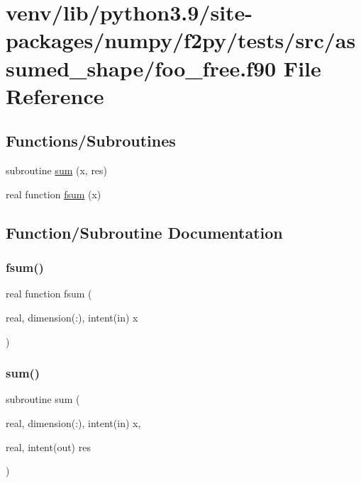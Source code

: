 \hypertarget{assumed__shape_2foo__free_8f90}{}\section{venv/lib/python3.9/site-\/packages/numpy/f2py/tests/src/assumed\+\_\+shape/foo\+\_\+free.f90 File Reference}
\label{assumed__shape_2foo__free_8f90}
\subsection*{Functions/\+Subroutines}
\begin{DoxyCompactItemize}
\item 
subroutine \hyperlink{assumed__shape_2foo__free_8f90_a1c860bb40bf43c289bc16f8634733f9a}{sum} (x, res)
\item 
real function \hyperlink{assumed__shape_2foo__free_8f90_ab73c9f20e5e2edd874331943a2afae89}{fsum} (x)
\end{DoxyCompactItemize}


\subsection{Function/\+Subroutine Documentation}
\mbox{\label{assumed__shape_2foo__free_8f90_ab73c9f20e5e2edd874331943a2afae89}} 
\subsubsection{\texorpdfstring{fsum()}{fsum()}}
{\footnotesize\ttfamily real function fsum (\begin{DoxyParamCaption}\item[{real, dimension(\+:), intent(in)}]{x }\end{DoxyParamCaption})}

\mbox{\label{assumed__shape_2foo__free_8f90_a1c860bb40bf43c289bc16f8634733f9a}} 
\subsubsection{\texorpdfstring{sum()}{sum()}}
{\footnotesize\ttfamily subroutine sum (\begin{DoxyParamCaption}\item[{real, dimension(\+:), intent(in)}]{x,  }\item[{real, intent(out)}]{res }\end{DoxyParamCaption})}

